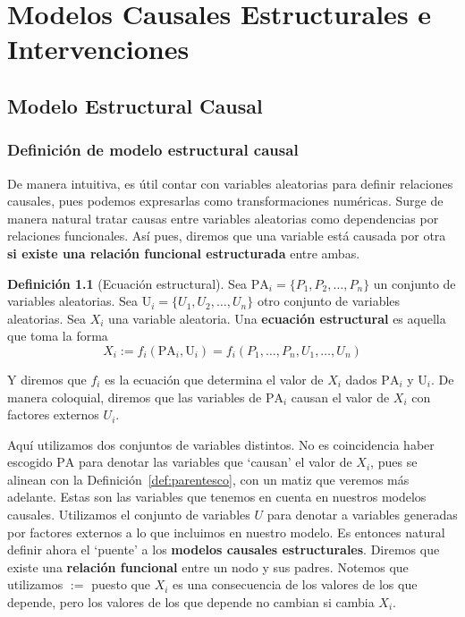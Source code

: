 \documentclass[a4paper,11pt,spanish, twoside]{tfg-uam-matematicas_25-26}
\theoremstyle{definition}
\newtheorem{defin}[teor]{Definición}
\begin{document}
\chapter{Modelos Causales Estructurales e Intervenciones}

\section{Modelo Estructural Causal}
\subsection{Definición de modelo estructural causal}
De manera intuitiva, es útil contar con variables aleatorias para definir relaciones causales, pues podemos expresarlas como transformaciones numéricas. Surge de manera natural tratar causas entre variables aleatorias como dependencias por relaciones funcionales. Así pues, diremos que una variable está causada por otra \textbf{si existe una relación funcional estructurada} entre ambas.

\begin{defin}[Ecuación estructural]
Sea $\text{PA}_i = \{P_1, P_2, \ldots, P_n\}$ un conjunto de variables aleatorias. Sea $\text{U}_i = \{U_1, U_2, \ldots, U_n\}$ otro conjunto de variables aleatorias.
Sea $X_i$ una variable aleatoria. Una \textbf{ecuación estructural} es aquella que toma la forma
\begin{equation*}
X_i := f_i(\text{PA}_i, \text{U}_i) = f_i(P_1, \ldots, P_n, U_1, \ldots, U_n)
\end{equation*}

Y diremos que $f_i$ es la ecuación que determina el valor de $X_i$ dados $\text{PA}_i$ y $\text{U}_i$. De manera coloquial, diremos que las variables de $\text{PA}_i$ causan el valor de $X_i$ con factores externos $U_i$.
\label{def:eq-estructural}
\end{defin}

Aquí utilizamos dos conjuntos de variables distintos. No es coincidencia haber escogido $\text{PA}$ para denotar las variables que `causan' el valor de $X_i$, pues se alinean con la Definición~\ref{def:parentesco}, con un matiz que veremos más adelante. Estas son las variables que tenemos en cuenta en nuestros modelos causales. Utilizamos el conjunto de variables $U$ para denotar a variables generadas por factores externos a lo que incluimos en nuestro modelo. Es entonces natural definir ahora el `puente' a los \textbf{modelos causales estructurales}. Diremos que existe una \textbf{relación funcional} entre un nodo y sus padres. Notemos que utilizamos $:=$ puesto que $X_i$ es una consecuencia de los valores de los que depende, pero los valores de los que depende no cambian si cambia $X_i$.
\end{document}
